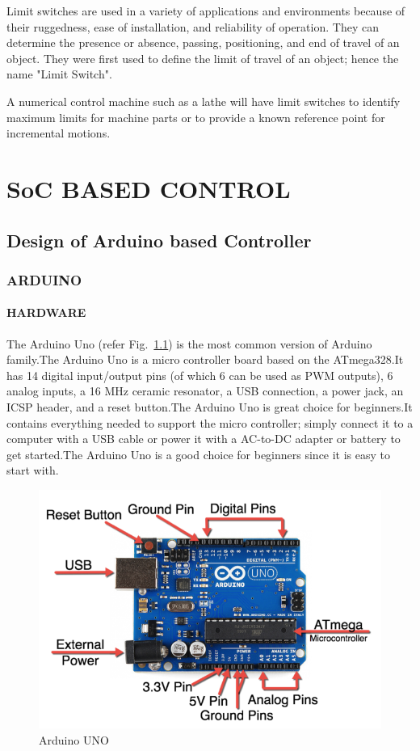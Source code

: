 \documentclass[MTech]{iitmdiss}
\begin{document}
Limit switches are used in a variety of applications and environments because of their ruggedness, ease of installation, and reliability of operation. They can determine the presence or absence, passing, positioning, and end of travel of an object. They were first used to define the limit of travel of an object; hence the name "Limit Switch".

A numerical control machine such as a lathe will have limit switches to identify maximum limits for machine parts or to provide a known reference point for incremental motions.

\chapter{SoC BASED CONTROL}

\section{Design of Arduino based Controller}

\subsection{ARDUINO}

\subsubsection{HARDWARE}

The Arduino Uno (refer Fig.~\ref{fig:uno}) is the most common version of Arduino family.The Arduino Uno is a micro controller board based on the ATmega328.It has 14 digital input/output pins (of which 6 can be used as PWM outputs), 6 analog inputs, a 16 MHz ceramic resonator, a USB connection, a power jack, an ICSP header, and a reset button.The Arduino Uno is great choice for beginners.It contains everything needed to support the micro controller; simply connect it to a computer with a USB cable or power it with a AC-to-DC adapter or battery to get started.The Arduino Uno is a good choice for beginners since it is easy to start with.

\begin{figure}[h!]
	\includegraphics[scale = 0.5]{ffigures/uno}
	\centering
	\caption{Arduino UNO}
	\label{fig:uno}
	
\end{figure}
\end{document}
